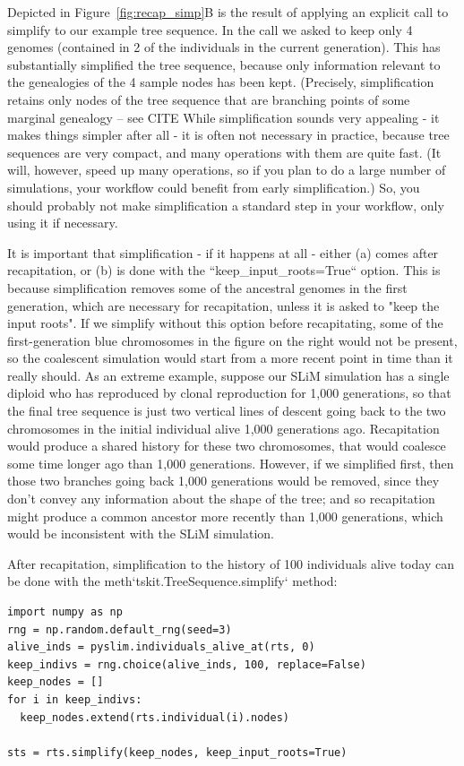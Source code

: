\documentclass[12pt]{article}
\begin{document}
Depicted in Figure~\ref{fig:recap_simp}B is the result of applying an explicit call to
simplify to our example tree sequence.
In the call we asked to keep only 4
genomes (contained in 2 of the individuals in the current generation). This has
substantially simplified the tree sequence, because only information relevant to the
genealogies of the 4 sample nodes has been kept. (Precisely, simplification retains only
nodes of the tree sequence that are branching points of some marginal genealogy -- see
CITE %
While simplification sounds very appealing - it makes things simpler after all -
it is often not necessary in practice, because tree sequences are very compact,
and many operations with them are quite fast.
(It will, however, speed up many operations, so if you plan to do a large number of simulations,
your workflow could benefit from early simplification.)
So, you should probably not make simplification a standard step in your workflow,
only using it if necessary.

It is important that simplification - if it happens at all -
either (a) comes after recapitation, or (b) is done with the
``keep\_input\_roots=True`` option.
This is because simplification removes some of the
ancestral genomes in the first generation,
which are necessary for recapitation,
unless it is asked to "keep the input roots".
If we simplify without this option before recapitating,
some of the first-generation blue chromosomes in the figure on the right
would not be present, so the coalescent simulation would start from a more recent point in time
than it really should.
As an extreme example, suppose our SLiM simulation has a single diploid who has reproduced
by clonal reproduction for 1,000 generations,
so that the final tree sequence is just two vertical lines of descent going back
to the two chromosomes in the initial individual alive 1,000 generations ago.
Recapitation would produce a shared history for these two chromosomes,
that would coalesce some time longer ago than 1,000 generations.
However, if we simplified first, then those two branches going back 1,000 generations would be removed,
since they don't convey any information about the shape of the tree;
and so recapitation might produce a common ancestor more recently than 1,000 generations,
which would be inconsistent with the SLiM simulation.

After recapitation,
simplification to the history of 100 individuals alive today
can be done with the {meth}`tskit.TreeSequence.simplify` method:
\begin{verbatim}
import numpy as np
rng = np.random.default_rng(seed=3)
alive_inds = pyslim.individuals_alive_at(rts, 0)
keep_indivs = rng.choice(alive_inds, 100, replace=False)
keep_nodes = []
for i in keep_indivs:
  keep_nodes.extend(rts.individual(i).nodes)

sts = rts.simplify(keep_nodes, keep_input_roots=True)
\end{verbatim}
\end{document}
